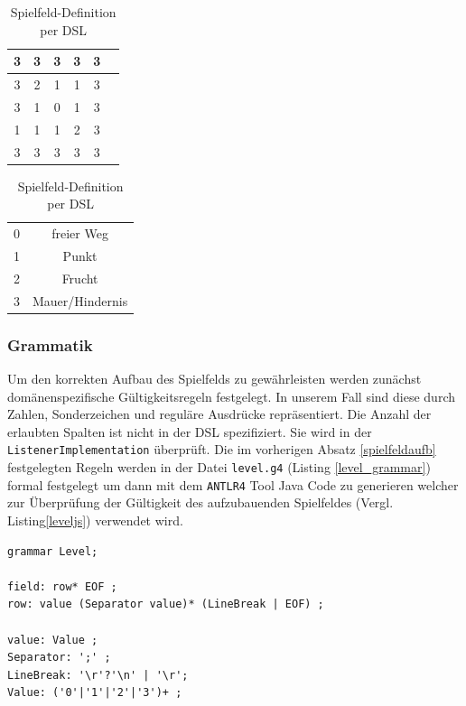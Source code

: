 \documentclass[conference]{IEEEtran}
\begin{document}
\begin{table}[!t]
\caption{Spielfeld-Definition per DSL}
\label{gameboard_dsl}
\centering
\begin{tabular}{|c|c|c|c|c|c|}
\hline
3 & 3 & 3 & 3 & 3\\
\hline
3 & 2 & 1 & 1 & 3\\
\hline
3 & 1 & 0 & 1 & 3\\
\hline
1 & 1 & 1 & 2 & 3\\
\hline
3 & 3 & 3 & 3 & 3\\
\hline
\end{tabular}
\begin{tabular}{|c|c|}
0 & freier Weg\\
1 & Punkt\\
2 & Frucht\\
3 & Mauer/Hindernis
\end{tabular}
\end{table}


\subsubsection{Grammatik}
Um den korrekten Aufbau des Spielfelds zu gewährleisten werden zunächst domänenspezifische Gültigkeitsregeln festgelegt. In unserem Fall sind diese durch Zahlen, Sonderzeichen und reguläre Ausdrücke repräsentiert. Die Anzahl der erlaubten Spalten ist nicht in der DSL spezifiziert. Sie wird in der \texttt{
ListenerImplementation} überprüft. Die im vorherigen Absatz \ref{spielfeldaufb} festgelegten Regeln werden in der Datei \texttt{level.g4} (Listing \ref{level_grammar}) formal festgelegt um dann mit dem \texttt{ANTLR4} Tool Java Code zu generieren welcher zur Überprüfung der Gültigkeit des aufzubauenden Spielfeldes (Vergl. Listing\ref{leveljs}) verwendet wird.

\begin{lstlisting}[captionpos=b, caption={Auszug aus der DSL spezifizierenden Grammatik \texttt{level.g4}}, label=level_grammar]
grammar Level;

field: row* EOF ;
row: value (Separator value)* (LineBreak | EOF) ;

value: Value ;
Separator: ';' ;
LineBreak: '\r'?'\n' | '\r';
Value: ('0'|'1'|'2'|'3')+ ;
\end{lstlisting}
\end{document}
